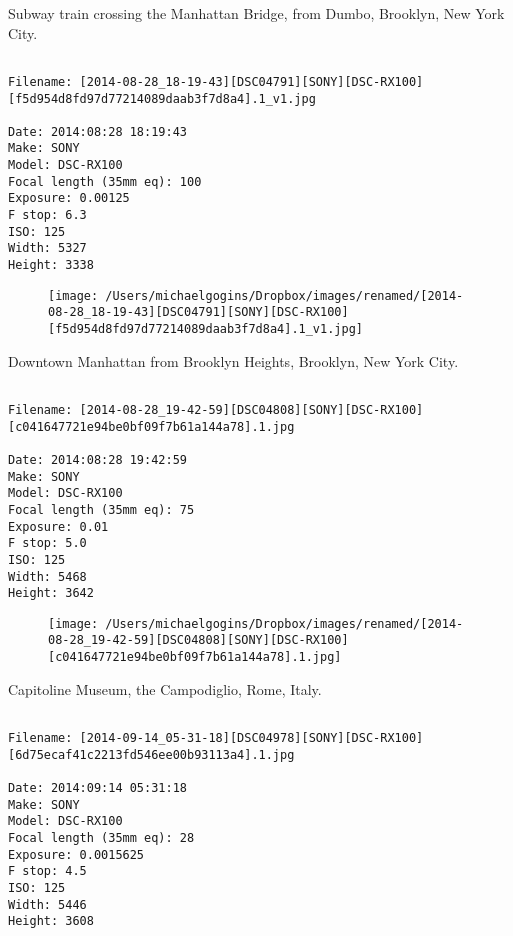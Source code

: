\clearpage
\onecolumn
\noindent Subway train crossing the Manhattan Bridge, from Dumbo, Brooklyn, New York City.
\noindent
\begin{lstlisting}

Filename: [2014-08-28_18-19-43][DSC04791][SONY][DSC-RX100][f5d954d8fd97d77214089daab3f7d8a4].1_v1.jpg

Date: 2014:08:28 18:19:43
Make: SONY
Model: DSC-RX100
Focal length (35mm eq): 100
Exposure: 0.00125
F stop: 6.3
ISO: 125
Width: 5327
Height: 3338
\end{lstlisting}
\clearpage

\begin{figure}
\texttt{[image: /Users/michaelgogins/Dropbox/images/renamed/[2014-08-28\_18-19-43][DSC04791][SONY][DSC-RX100][f5d954d8fd97d77214089daab3f7d8a4].1\_v1.jpg]}
\end{figure}
    
\clearpage
\onecolumn
\noindent Downtown Manhattan from Brooklyn Heights, Brooklyn, New York City.
\noindent
\begin{lstlisting}

Filename: [2014-08-28_19-42-59][DSC04808][SONY][DSC-RX100][c041647721e94be0bf09f7b61a144a78].1.jpg

Date: 2014:08:28 19:42:59
Make: SONY
Model: DSC-RX100
Focal length (35mm eq): 75
Exposure: 0.01
F stop: 5.0
ISO: 125
Width: 5468
Height: 3642
\end{lstlisting}
\clearpage

\begin{figure}
\texttt{[image: /Users/michaelgogins/Dropbox/images/renamed/[2014-08-28\_19-42-59][DSC04808][SONY][DSC-RX100][c041647721e94be0bf09f7b61a144a78].1.jpg]}
\end{figure}
    
\clearpage
\onecolumn
\noindent Capitoline Museum, the Campodiglio, Rome, Italy.
\noindent
\begin{lstlisting}

Filename: [2014-09-14_05-31-18][DSC04978][SONY][DSC-RX100][6d75ecaf41c2213fd546ee00b93113a4].1.jpg

Date: 2014:09:14 05:31:18
Make: SONY
Model: DSC-RX100
Focal length (35mm eq): 28
Exposure: 0.0015625
F stop: 4.5
ISO: 125
Width: 5446
Height: 3608
\end{lstlisting}
\clearpage

